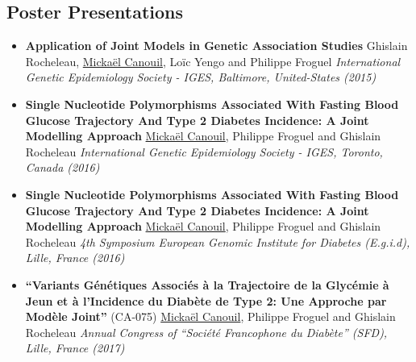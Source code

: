 \documentclass[11pt,a4paper,sans]{moderncv}
\begin{document}
\subsection{Poster Presentations}
\begin{itemize}
    \setlength{\itemsep}{0.5em}

    \item \textbf{Application of Joint Models in Genetic Association Studies}
        \newline Ghislain Rocheleau, \underline{Mickaël Canouil}, Loïc Yengo and Philippe Froguel
        \newline \textit{International Genetic Epidemiology Society - IGES, Baltimore, United-States (2015)}

    \item \textbf{Single Nucleotide Polymorphisms Associated With Fasting Blood Glucose Trajectory And Type 2 Diabetes Incidence: A Joint Modelling Approach}
        \newline \underline{Mickaël Canouil}, Philippe Froguel and Ghislain Rocheleau
        \newline \textit{International Genetic Epidemiology Society - IGES, Toronto, Canada (2016)}

    \item \textbf{Single Nucleotide Polymorphisms Associated With Fasting Blood Glucose Trajectory And Type 2 Diabetes Incidence: A Joint Modelling Approach}
        \newline \underline{Mickaël Canouil}, Philippe Froguel and Ghislain Rocheleau
        \newline \textit{4th Symposium European Genomic Institute for Diabetes (E.g.i.d), Lille, France (2016)}

    \item \textbf{``Variants Génétiques Associés à la Trajectoire de la Glycémie à Jeun et à l’Incidence du Diabète de Type 2: Une Approche par Modèle Joint''} (CA-075)
        \newline \underline{Mickaël Canouil}, Philippe Froguel and Ghislain Rocheleau
        \newline \textit{Annual Congress of ``Société Francophone du Diabète'' (SFD), Lille, France (2017)}

\end{itemize}


\pagebreak


\nocite{*}
\end{document}
